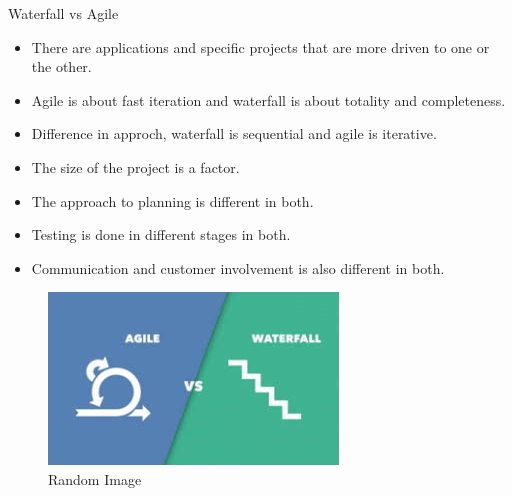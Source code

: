 \begin{section}{Waterfall vs Agile}
    
    \begin{itemize}
        \item There are applications and specific projects that are more driven to one or the other.

        \item Agile is about fast iteration and waterfall is about totality and completeness.
    
        \item Difference in approch, waterfall is sequential and agile is iterative.
    
        \item The size of the project is a factor.
        
        \item The approach to planning is different in both.

        \item Testing is done in different stages in both.
    
        \item Communication and customer involvement is also different in both.
    
    \end{itemize}
    \begin{figure}
        \centering
        \includegraphics[scale=0.2]{images/illustrate/agilevscascade.png}
        \caption{Random Image}
        \end{figure}
    \end{section}